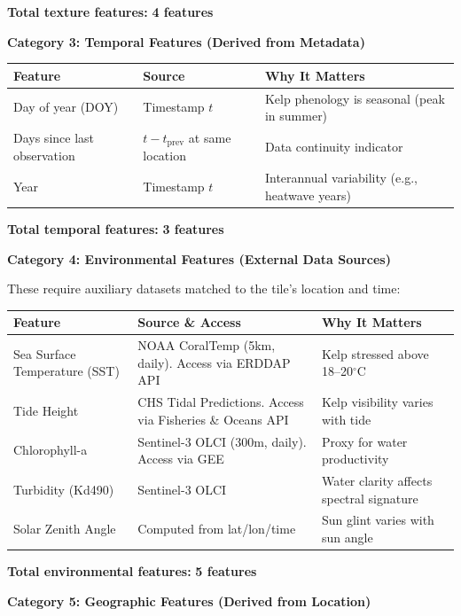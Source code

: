 \documentclass[11pt]{article}
\begin{document}
\textbf{Total texture features:} \textbf{4 features}

\textbf{Category 3: Temporal Features (Derived from Metadata)}

\begin{center}
\begin{tabular}{p{4cm}p{4cm}p{4cm}}
\toprule
\textbf{Feature} & \textbf{Source} & \textbf{Why It Matters} \\
\midrule
Day of year (DOY) & Timestamp $t$ & Kelp phenology is seasonal (peak in summer) \\
Days since last observation & $t - t_{\text{prev}}$ at same location & Data continuity indicator \\
Year & Timestamp $t$ & Interannual variability (e.g., heatwave years) \\
\bottomrule
\end{tabular}
\end{center}

\textbf{Total temporal features:} \textbf{3 features}

\textbf{Category 4: Environmental Features (External Data Sources)}

These require auxiliary datasets matched to the tile's location and time:

\begin{center}
\begin{tabular}{p{3.5cm}p{4cm}p{4.5cm}}
\toprule
\textbf{Feature} & \textbf{Source \& Access} & \textbf{Why It Matters} \\
\midrule
Sea Surface Temperature (SST) & NOAA CoralTemp (5km, daily). Access via ERDDAP API & Kelp stressed above 18--20$^\circ$C \\
Tide Height & CHS Tidal Predictions. Access via Fisheries \& Oceans API & Kelp visibility varies with tide \\
Chlorophyll-a & Sentinel-3 OLCI (300m, daily). Access via GEE & Proxy for water productivity \\
Turbidity (Kd490) & Sentinel-3 OLCI & Water clarity affects spectral signature \\
Solar Zenith Angle & Computed from lat/lon/time & Sun glint varies with sun angle \\
\bottomrule
\end{tabular}
\end{center}

\textbf{Total environmental features:} \textbf{5 features}

\textbf{Category 5: Geographic Features (Derived from Location)}
\end{document}
